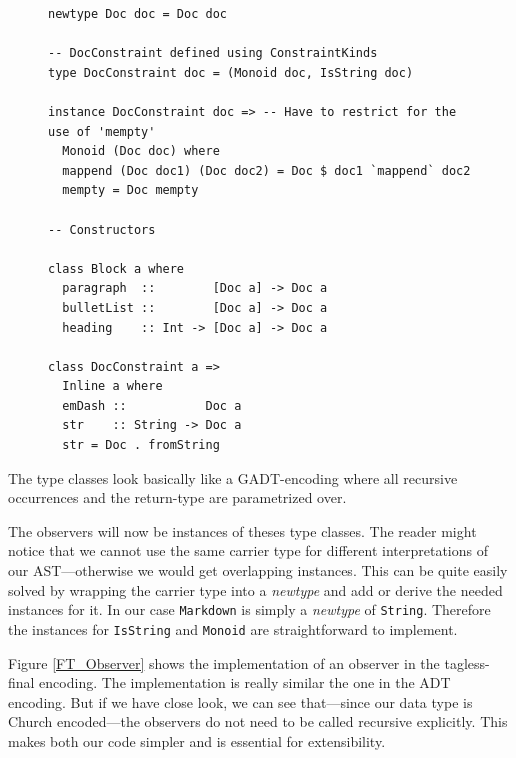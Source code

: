 \begin{figure}
\begin{lstlisting}
newtype Doc doc = Doc doc

-- DocConstraint defined using ConstraintKinds
type DocConstraint doc = (Monoid doc, IsString doc)

instance DocConstraint doc => -- Have to restrict for the use of 'mempty'
  Monoid (Doc doc) where
  mappend (Doc doc1) (Doc doc2) = Doc $ doc1 `mappend` doc2
  mempty = Doc mempty

-- Constructors

class Block a where
  paragraph  ::        [Doc a] -> Doc a
  bulletList ::        [Doc a] -> Doc a
  heading    :: Int -> [Doc a] -> Doc a

class DocConstraint a =>
  Inline a where
  emDash ::           Doc a
  str    :: String -> Doc a
  str = Doc . fromString
\end{lstlisting}
\end{figure}

The type classes look basically like a GADT-encoding where all recursive
occurrences and the return-type are parametrized over.

The observers will now be instances of theses type classes. The reader might
notice that we cannot use the same carrier type for different interpretations of
our AST—otherwise we would get overlapping instances. This can be quite easily
solved by wrapping the carrier type into a \emph{newtype} and add or derive the
needed instances for it. In our case \texttt{Markdown} is simply a
\emph{newtype} of \texttt{String}. Therefore the instances for \texttt{IsString}
and \texttt{Monoid} are straightforward to implement.

Figure \ref{FT_Observer} shows the implementation of an observer in the
tagless-final encoding. The implementation is really similar the one in the ADT
encoding. But if we have close look, we can see that—since our data type is
Church encoded—the observers do not need to be called recursive explicitly. This
makes both our code simpler and is essential for extensibility.

